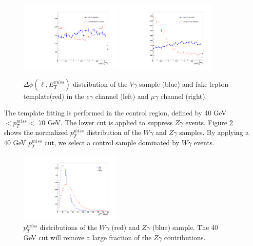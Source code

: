 \documentclass[thesis.tex]{subfiles}
\renewcommand\_{\textunderscore\allowbreak}
\begin{document}
\begin{figure}[hbtp]
    \begin{center}
    \includegraphics[width=0.45\textwidth]{Figures/dphiTemplate_eg.pdf}
    \includegraphics[width=0.45\textwidth]{Figures/dphiTemplate_mg.pdf}
    \end{center}
  \caption{$\Delta\phi\left(\ell,E_{T}^{miss}\right)$ distribution of the $V\gamma$ sample (blue) and fake lepton template(red) in the $e\gamma$ channel (left) and $\mu\gamma$ channel (right). }
    \label{fig:dphitemplate}
\end{figure}

The template fitting is performed in the control region, defined by 40 GeV $< p_{T}^{miss} <$ 70 GeV. The lower cut is applied to suppress $Z\gamma$ events. Figure \ref{fig:WGZG_met} shows the normalized $p_{T}^{miss}$ distribution of the $W\gamma$ and $Z\gamma$ samples. By applying a 40 GeV $p_{T}^{miss}$ cut, we select a control sample dominated by $W\gamma$ events.  

\begin{figure}[hbtp]
  \centering
    \includegraphics[width=0.45\textwidth]{Figures/dphiTemplate_MET.pdf}
  \caption{$p_T^{miss}$ distributions of the $W\gamma$ (red) and $Z\gamma$ (blue) sample. The 40 GeV cut will remove a large fraction of the $Z\gamma$ contributions.}
    \label{fig:WGZG_met}
\end{figure}
\end{document}
